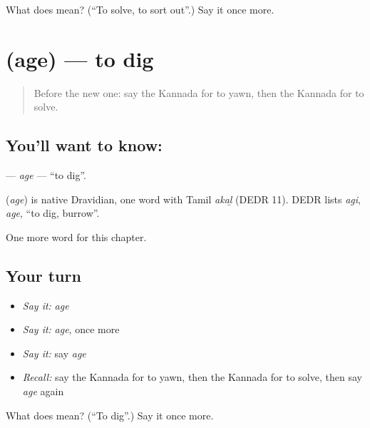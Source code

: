 \begin{tcolorbox}[breakable,colback=teal!4,colframe=teal!35!black,title={Before you move on}]
What does  mean? (\textquotedblleft{}To solve, to sort out\textquotedblright{}.) Say it once more.
\end{tcolorbox}
\section[\texorpdfstring{\kn{ಅಗೆ} (age)}{ಅಗೆ (age)}]{ (age) — to dig}

\label{lesson:KA-C279-age}



\begin{quote}
Before the new one: say the Kannada for to yawn, then the Kannada for to solve.
\end{quote}

\subsection*{You'll want to know: }
\textbf{} — \emph{age} — \textquotedblleft{}to dig\textquotedblright{}.

\begin{cousinweb}
\textbf{} (\emph{age}) is native Dravidian, one word with Tamil \emph{akaḻ} (DEDR 11). DEDR lists \emph{agi}, \emph{age}, \textquotedblleft{}to dig, burrow\textquotedblright{}.
\end{cousinweb}

\begin{grammarlens}[title={What you've built}]
One more word for this chapter.
\end{grammarlens}

\subsection*{Your turn}
\begin{itemize}
\raggedright
  \item \emph{Say it:} \emph{age}
  \item \emph{Say it:} \emph{age}, once more
  \item \emph{Say it:} say \emph{age}
  \item \emph{Recall:} say the Kannada for to yawn, then the Kannada for to solve, then say \emph{age} again
\end{itemize}

\begin{tcolorbox}[breakable,colback=teal!4,colframe=teal!35!black,title={Before you move on}]
What does  mean? (\textquotedblleft{}To dig\textquotedblright{}.) Say it once more.
\end{tcolorbox}
